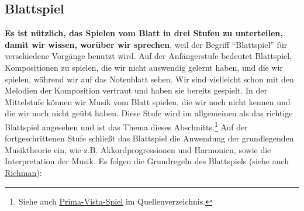 
\subsection{Blattspiel}
\label{c1iii11}

\textbf{Es ist nützlich, das Spielen vom Blatt in drei Stufen zu unterteilen, damit wir wissen, worüber wir sprechen}, weil der Begriff \enquote{Blattspiel} für verschiedene Vorgänge benutzt wird.
Auf der Anfängerstufe bedeutet Blattspiel, Kompositionen zu spielen, die wir nicht auswendig gelernt haben, und die wir spielen, während wir auf das Notenblatt sehen.
Wir sind vielleicht schon mit den Melodien der Komposition vertraut und haben sie bereits gespielt.
In der Mittelstufe können wir Musik vom Blatt spielen, die wir noch nicht kennen und die wir noch nicht geübt haben.
Diese Stufe wird im allgemeinen als das richtige Blattspiel angesehen und ist das Thema dieses Abschnitts.\footnote{Siehe auch \hyperref[c030530]{Prima-Vista-Spiel} im Quellenverzeichnis.}
Auf der fortgeschrittenen Stufe schließt das Blattspiel die Anwendung der grundlegenden Musiktheorie ein, wie z.B. Akkordprogressionen und Harmonien, sowie die Interpretation der Musik.
Es folgen die Grundregeln des Blattspiels (siehe auch \hyperref[Richman]{Richman}):

